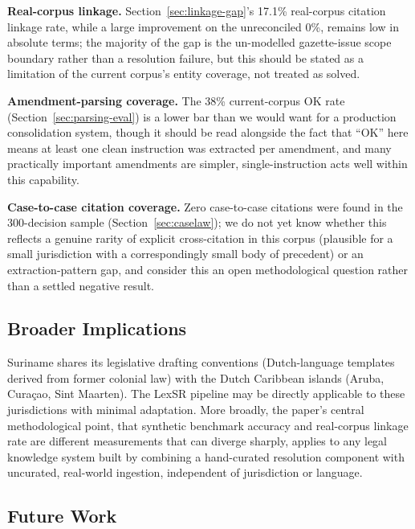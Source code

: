 \documentclass{IOS-Book-Article}
\begin{document}
\textbf{Real-corpus linkage.} Section~\ref{sec:linkage-gap}'s 17.1\% real-corpus citation linkage rate, while a large
improvement on the unreconciled 0\%, remains low in absolute terms; the majority of the gap is
the un-modelled gazette-issue scope boundary rather than a resolution failure, but this
should be stated as a limitation of the current corpus's entity coverage, not treated as
solved.

\textbf{Amendment-parsing coverage.} The 38\% current-corpus OK rate (Section~\ref{sec:parsing-eval}) is a lower bar
than we would want for a production consolidation system, though it should be read alongside
the fact that ``OK'' here means at least one clean instruction was extracted per amendment,
and many practically important amendments are simpler, single-instruction acts well within
this capability.

\textbf{Case-to-case citation coverage.} Zero case-to-case citations were found in the 300-decision
sample (Section~\ref{sec:caselaw}); we do not yet know whether this reflects a genuine rarity of explicit
cross-citation in this corpus (plausible for a small jurisdiction with a correspondingly
small body of precedent) or an extraction-pattern gap, and consider this an open
methodological question rather than a settled negative result.

\subsection{Broader Implications}

Suriname shares its legislative drafting conventions (Dutch-language templates derived from
former colonial law) with the Dutch Caribbean islands (Aruba, Cura\c{c}ao, Sint Maarten). The
LexSR pipeline may be directly applicable to these jurisdictions with minimal adaptation.
More broadly, the paper's central methodological point, that synthetic benchmark accuracy
and real-corpus linkage rate are different measurements that can diverge sharply, applies
to any legal knowledge system built by combining a hand-curated resolution component with
uncurated, real-world ingestion, independent of jurisdiction or language.

\subsection{Future Work}
\label{sec:future}
\end{document}

